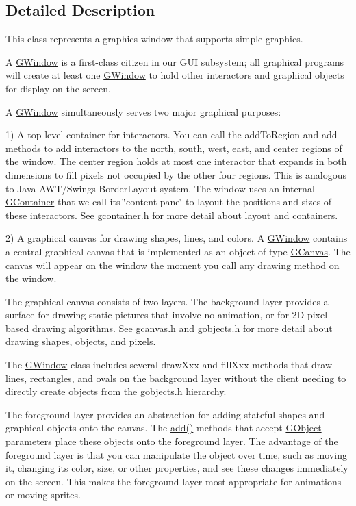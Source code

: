 \subsection{Detailed Description}
This class represents a graphics window that supports simple graphics. 

A \mbox{\hyperlink{classGWindow}{G\+Window}} is a first-\/class citizen in our G\+UI subsystem; all graphical programs will create at least one \mbox{\hyperlink{classGWindow}{G\+Window}} to hold other interactors and graphical objects for display on the screen.

A \mbox{\hyperlink{classGWindow}{G\+Window}} simultaneously serves two major graphical purposes\+:

1) A top-\/level container for interactors. You can call the add\+To\+Region and add methods to add interactors to the north, south, west, east, and center regions of the window. The center region holds at most one interactor that expands in both dimensions to fill pixels not occupied by the other four regions. This is analogous to Java A\+W\+T/\+Swing\textquotesingle{}s Border\+Layout system. The window uses an internal \mbox{\hyperlink{classGContainer}{G\+Container}} that we call its \char`\"{}content pane\char`\"{} to layout the positions and sizes of these interactors. See \mbox{\hyperlink{gcontainer_8h_source}{gcontainer.\+h}} for more detail about layout and containers.

2) A graphical canvas for drawing shapes, lines, and colors. A \mbox{\hyperlink{classGWindow}{G\+Window}} contains a central graphical canvas that is implemented as an object of type \mbox{\hyperlink{classGCanvas}{G\+Canvas}}. The canvas will appear on the window the moment you call any drawing method on the window.

The graphical canvas consists of two layers. The background layer provides a surface for drawing static pictures that involve no animation, or for 2D pixel-\/based drawing algorithms. See \mbox{\hyperlink{gcanvas_8h_source}{gcanvas.\+h}} and \mbox{\hyperlink{gobjects_8h_source}{gobjects.\+h}} for more detail about drawing shapes, objects, and pixels.

The \mbox{\hyperlink{classGWindow}{G\+Window}} class includes several draw\+Xxx and fill\+Xxx methods that draw lines, rectangles, and ovals on the background layer without the client needing to directly create objects from the \mbox{\hyperlink{gobjects_8h_source}{gobjects.\+h}} hierarchy.

The foreground layer provides an abstraction for adding stateful shapes and graphical objects onto the canvas. The \mbox{\hyperlink{classGWindow_a6f99b7c841256dbdc5acaafbbca4e685}{add()}} methods that accept \mbox{\hyperlink{classGObject}{G\+Object}} parameters place these objects onto the foreground layer. The advantage of the foreground layer is that you can manipulate the object over time, such as moving it, changing its color, size, or other properties, and see these changes immediately on the screen. This makes the foreground layer most appropriate for animations or moving sprites.

